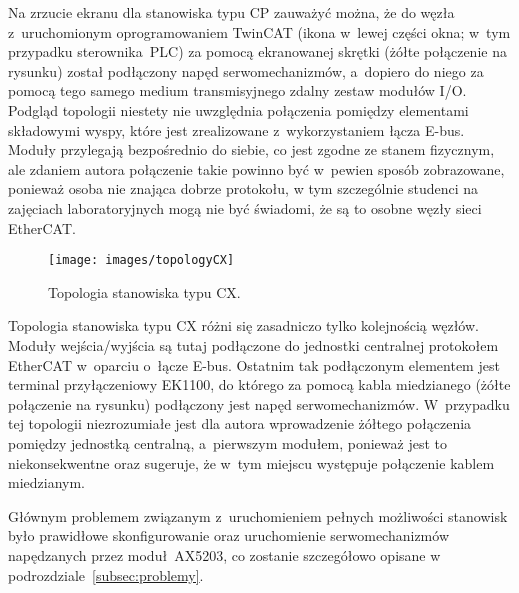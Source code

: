 Na zrzucie ekranu dla stanowiska typu CP zauważyć można, że do węzła z~uruchomionym oprogramowaniem TwinCAT (ikona w~lewej części okna; w~tym przypadku sterownika~PLC) za pomocą ekranowanej skrętki (żółte połączenie na rysunku) został podłączony napęd serwomechanizmów, a~dopiero do niego za pomocą tego samego medium transmisyjnego zdalny zestaw modułów I/O. Podgląd topologii niestety nie uwzględnia połączenia pomiędzy elementami składowymi wyspy, które jest zrealizowane z~wykorzystaniem łącza E-bus. Moduły przylegają bezpośrednio do siebie, co jest zgodne ze stanem fizycznym, ale zdaniem autora połączenie takie powinno być w~pewien sposób zobrazowane, ponieważ osoba nie znająca dobrze protokołu, w tym szczególnie studenci na zajęciach laboratoryjnych mogą nie być świadomi, że są to osobne węzły sieci EtherCAT.
\clearpage
\begin{figure}[!htb] 	\centering 	\texttt{[image: images/topologyCX]} \caption{Topologia stanowiska typu CX.} \label{topology:cx} \end{figure}

Topologia stanowiska typu CX różni się zasadniczo tylko kolejnością węzłów. Moduły wejścia/wyjścia są tutaj podłączone do jednostki centralnej protokołem EtherCAT w~oparciu o~łącze E-bus. Ostatnim tak podłączonym elementem jest terminal przyłączeniowy EK1100, do którego za pomocą kabla miedzianego (żółte połączenie na rysunku) podłączony jest napęd serwomechanizmów. W~przypadku tej topologii niezrozumiałe jest dla autora wprowadzenie żółtego połączenia pomiędzy jednostką centralną, a~pierwszym modułem, ponieważ jest to niekonsekwentne oraz sugeruje, że w~tym miejscu występuje połączenie kablem miedzianym.

Głównym problemem związanym z~uruchomieniem pełnych możliwości stanowisk było prawidłowe skonfigurowanie oraz uruchomienie serwomechanizmów napędzanych przez moduł~AX5203, co zostanie szczegółowo opisane w podrozdziale~\ref{subsec:problemy}.

